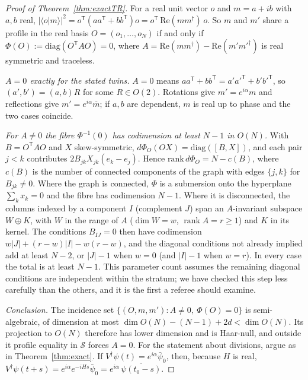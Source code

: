 \documentclass[11pt]{article}
\theoremstyle{definition}
\theoremstyle{remark}
\begin{document}
\begin{proof}[Proof of Theorem~\ref{thm:exactTR}]
For a real unit vector $o$ and $m=a+ib$ with $a,b$ real, $|\langle o|m\rangle|^2=o^{\mathsf T}(aa^{\mathsf T}+bb^{\mathsf T})o=o^{\mathsf T}\,\mathrm{Re}(mm^\dagger)\,o$. So $m$ and $m'$ share a profile in the real basis $O=(o_1,\dots,o_N)$ if and only if $\Phi(O):=\mathrm{diag}(O^{\mathsf T}AO)=0$, where $A=\mathrm{Re}(mm^\dagger)-\mathrm{Re}(m'm'^\dagger)$ is real symmetric and traceless.

\emph{$A=0$ exactly for the stated twins.} $A=0$ means $aa^{\mathsf T}+bb^{\mathsf T}=a'a'^{\mathsf T}+b'b'^{\mathsf T}$, so $(a',b')=(a,b)R$ for some $R\in O(2)$. Rotations give $m'=e^{i\alpha}m$ and reflections give $m'=e^{i\alpha}\bar m$; if $a,b$ are dependent, $m$ is real up to phase and the two cases coincide.

\emph{For $A\ne0$ the fibre $\Phi^{-1}(0)$ has codimension at least $N-1$ in $O(N)$.} With $B=O^{\mathsf T}AO$ and $X$ skew-symmetric, $d\Phi_O(OX)=\mathrm{diag}([B,X])$, and each pair $j<k$ contributes $2B_{jk}X_{jk}(e_k-e_j)$. Hence $\mathrm{rank}\,d\Phi_O=N-c(B)$, where $c(B)$ is the number of connected components of the graph with edges $\{j,k\}$ for $B_{jk}\ne0$. Where the graph is connected, $\Phi$ is a submersion onto the hyperplane $\sum_kx_k=0$ and the fibre has codimension $N-1$. Where it is disconnected, the columns indexed by a component $I$ (complement $J$) span an $A$-invariant subspace $W\oplus K$, with $W$ in the range of $A$ ($\dim W=w$, $\operatorname{rank}A=r\ge1$) and $K$ in its kernel. The conditions $B_{IJ}=0$ then have codimension $w|J|+(r-w)|I|-w(r-w)$, and the diagonal conditions not already implied add at least $N-2$, or $|J|-1$ when $w=0$ (and $|I|-1$ when $w=r$). In every case the total is at least $N-1$. This parameter count assumes the remaining diagonal conditions are independent within the stratum; we have checked this step less carefully than the others, and it is the first a referee should examine.

\emph{Conclusion.} The incidence set $\{(O,m,m'):A\ne0,\ \Phi(O)=0\}$ is semi-algebraic, of dimension at most $\dim O(N)-(N-1)+2d<\dim O(N)$. Its projection to $O(N)$ therefore has lower dimension and is Haar-null, and outside it profile equality in $\mathcal S$ forces $A=0$. For the statement about divisions, argue as in Theorem~\ref{thm:exact}. If $V^\dagger\psi(t)=e^{i\alpha}\bar\psi_0$, then, because $H$ is real, $V^\dagger\psi(t+s)=e^{i\alpha}e^{-iHs}\bar\psi_0=e^{i\alpha}\,\overline{\psi(t_0-s)}$.
\end{proof}
\end{document}
